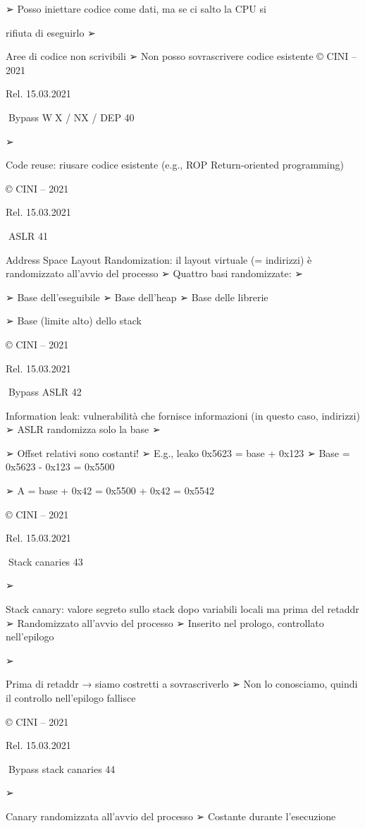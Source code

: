 \documentclass[11pt,a4paper]{article}
\begin{document}
➢ Posso iniettare codice come dati, ma se ci salto la CPU si

rifiuta di eseguirlo ➢

Aree di codice non scrivibili ➢ Non posso sovrascrivere codice esistente
© CINI -- 2021

Rel. 15.03.2021

Bypass W⊕X / NX / DEP 40

➢

Code reuse: riusare codice esistente (e.g., ROP Return-oriented
programming)

© CINI -- 2021

Rel. 15.03.2021

ASLR 41

Address Space Layout Randomization: il layout virtuale (= indirizzi) è
randomizzato all'avvio del processo ➢ Quattro basi randomizzate: ➢

➢ Base dell'eseguibile ➢ Base dell'heap ➢ Base delle librerie

➢ Base (limite alto) dello stack

© CINI -- 2021

Rel. 15.03.2021

Bypass ASLR 42

Information leak: vulnerabilità che fornisce informazioni (in questo
caso, indirizzi) ➢ ASLR randomizza solo la base ➢

➢ Offset relativi sono costanti! ➢ E.g., leako 0x5623 = base + 0x123 ➢
Base = 0x5623 - 0x123 = 0x5500

➢ A = base + 0x42 = 0x5500 + 0x42 = 0x5542

© CINI -- 2021

Rel. 15.03.2021

Stack canaries 43

➢

Stack canary: valore segreto sullo stack dopo variabili locali ma prima
del retaddr ➢ Randomizzato all'avvio del processo ➢ Inserito nel
prologo, controllato nell'epilogo

➢

Prima di retaddr → siamo costretti a sovrascriverlo ➢ Non lo conosciamo,
quindi il controllo nell'epilogo fallisce

© CINI -- 2021

Rel. 15.03.2021

Bypass stack canaries 44

➢

Canary randomizzata all'avvio del processo ➢ Costante durante
l'esecuzione
\end{document}
